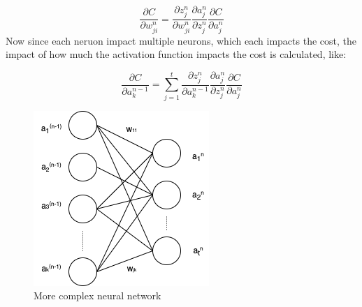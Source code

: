 $$
\frac{\partial C}{\partial w_{ji}^n} =\frac{\partial z_j^n}{\partial w_{ji}^n}\frac{\partial a_j^n}{\partial z_j^n}\frac{\partial C}{  \partial a_j^n}
$$
Now since each neruon impact multiple neurons, which each impacts the cost, the impact of how much the activation function impacts the cost is calculated, like:

$$
\frac{\partial C}{\partial a^{n-1}_k} = \sum^t_{j=1} \frac{\partial z_j^n}{\partial a_k^{n-1}}\frac{\partial a_j^n}{\partial z_j^n}\frac{\partial C}{  \partial a_j^n}
$$

\begin{figure}[!ht]
  \centering
  \includegraphics[scale=0.4]{latex/imgs/multibackprop.png}
  \caption{More complex neural network}\label{Baseline:before}
\end{figure}
